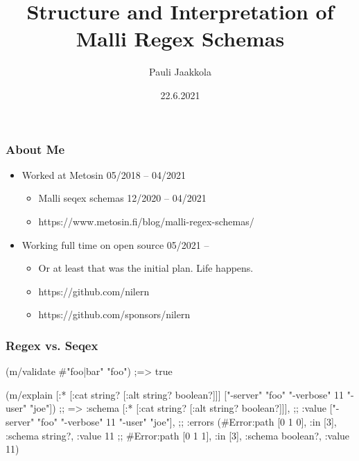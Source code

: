 \documentclass{beamer}
\title{Structure and Interpretation of Malli Regex Schemas}
\author{Pauli Jaakkola}
\date{22.6.2021}
\begin{document}
\frame{\titlepage}


\begin{frame}
\frametitle{About Me}

\begin{itemize}
\item Worked at Metosin 05/2018 -- 04/2021
\begin{itemize}
    \item Malli seqex schemas 12/2020 -- 04/2021
    \item https://www.metosin.fi/blog/malli-regex-schemas/
\end{itemize}
\item Working full time on open source 05/2021 --
\begin{itemize}
    \item Or at least that was the initial plan. Life happens.
    \item https://github.com/nilern
    \item https://github.com/sponsors/nilern
\end{itemize}
\end{itemize}
\end{frame}


\begin{frame}[fragile]
\frametitle{Regex vs. Seqex}

\begin{semiverbatim}
(m/validate #"foo|bar" "foo") ;=> true
\end{semiverbatim}

{\scriptsize
\begin{semiverbatim}
(m/explain 
  [:* [:cat string? [:alt string? boolean?]]]
  ["-server" "foo" "-verbose" 11 "-user" "joe"])
;; => {:schema [:* [:cat string? [:alt string? boolean?]]],
;;     :value ["-server" "foo" "-verbose" 11 "-user" "joe"],
;;     :errors (#Error{:path [0 1 0], :in [3], :schema string?, :value 11}
;;              #Error{:path [0 1 1], :in [3], :schema boolean?, :value 11})}
\end{semiverbatim}
}
\end{frame}

\end{document}
